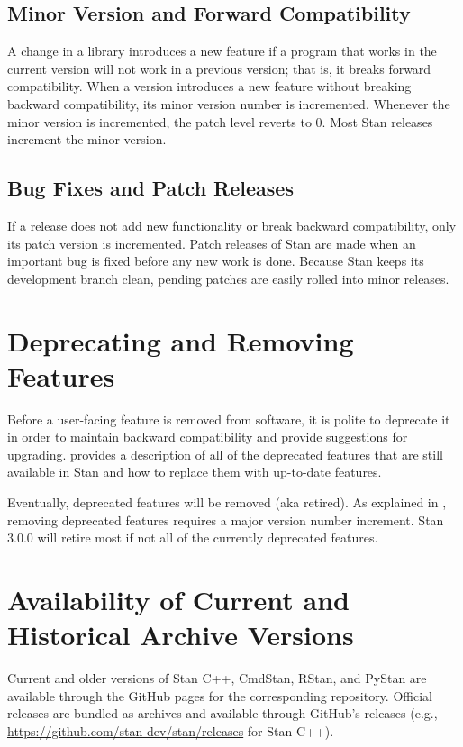 \subsection{Minor Version and Forward Compatibility}

A change in a library introduces a new feature if a program that works
in the current version will not work in a previous version; that is,
it breaks forward compatibility.  When a version introduces a new
feature without breaking backward compatibility, its minor version
number is incremented.  Whenever the minor version is incremented, the
patch level reverts to 0.  Most Stan releases increment the minor
version. 

\subsection{Bug Fixes and Patch Releases}

If a release does not add new functionality or break backward
compatibility, only its patch version is incremented.  Patch releases
of Stan are made when an important bug is fixed before any new work is
done.  Because Stan keeps its development branch clean, pending
patches are easily rolled into minor releases.

\section{Deprecating and Removing Features}\label{process-deprecation.section}

Before a user-facing feature is removed from software, it is polite to
deprecate it in order to maintain backward compatibility and provide
suggestions for upgrading.   provides
a description of all of the deprecated features that are still
available in Stan and how to replace them with up-to-date features.

Eventually, deprecated features will be removed (aka retired).  As
explained in , removing deprecated
features requires a major version number increment.  Stan 3.0.0 will
retire most if not all of the currently deprecated features.




\section{Availability of Current and Historical Archive Versions}

Current and older versions of Stan C++, CmdStan, RStan, and PyStan are
available through the GitHub pages for the corresponding repository.
Official releases are bundled as archives and available through
GitHub's releases (e.g.,
\url{https://github.com/stan-dev/stan/releases} for Stan C++).

